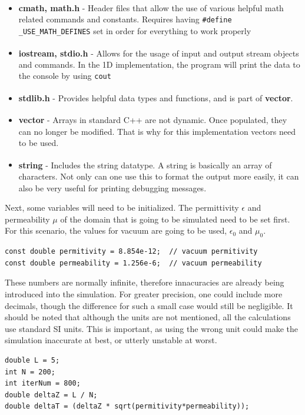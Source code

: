 \begin{itemize}
	\item \textbf{cmath, math.h}\textsuperscript{\cite{cmath}} - Header files that allow the use of various helpful math related commands and constants. Requires having \space \verb!#define _USE_MATH_DEFINES! set in order for everything to work properly
	\item \textbf{iostream, stdio.h}\textsuperscript{\cite{iostream}} - Allows for the usage of input and output stream objects and commands. In the 1D implementation, the program will print the data to the console by using \verb!cout!
	\item \textbf{stdlib.h}\textsuperscript{\cite{cstdlib}} - Provides helpful data types and functions, and is part of \textbf{vector}.
	\item \textbf{vector}\textsuperscript{\cite{vector}} - Arrays in standard C++ are not dynamic. Once populated, they can no longer be modified. That is why for this implementation vectors need to be used.
	\item \textbf{string}\textsuperscript{\cite{string}} - Includes the string datatype. A string is basically an array of characters. Not only can one use this to format the output more easily, it can also be very useful for printing debugging messages.
\end{itemize}

Next, some variables will need to be initialized. The permittivity $\epsilon$ and permeability $\mu$ of the domain that is going to be simulated need to be set first. For this scenario, the values for vacuum are going to be used, $\epsilon_{0}$ and $\mu_{0}$.

\begin{verbatim}
const double permitivity = 8.854e-12;  // vacuum permitivity
const double permeability = 1.256e-6;  // vacuum permeability
\end{verbatim}

These numbers are normally infinite, therefore innacuracies are already being introduced into the simulation. For greater precision, one could include more decimals, though the difference for such a small case would still be negligible. It should be noted that although the units are not mentioned, all the calculations use standard SI units. This is important, as using the wrong unit could make the simulation inaccurate at best, or utterly unstable at worst.

\begin{verbatim}
double L = 5;
int N = 200;
int iterNum = 800;
double deltaZ = L / N;
double deltaT = (deltaZ * sqrt(permitivity*permeability));
\end{verbatim}

